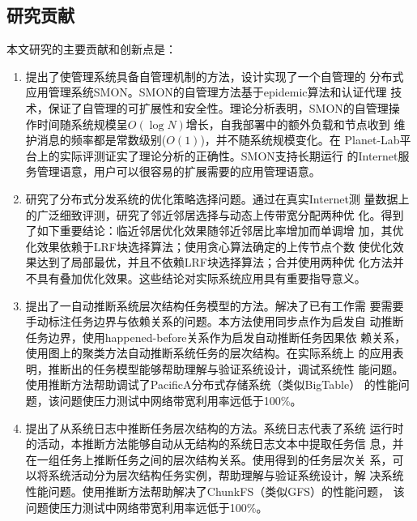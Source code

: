 \subsection{研究贡献}

本文研究的主要贡献和创新点是：

\begin{enumerate}

    \item 提出了使管理系统具备自管理机制的方法，设计实现了一个自管理的
    分布式应用管理系统SMON。SMON的自管理方法基于epidemic算法和认证代理
    技术，保证了自管理的可扩展性和安全性。理论分析表明，SMON的自管理操
    作时间随系统规模呈$O(\log N)$增长，自我部署中的额外负载和节点收到
    维护消息的频率都是常数级别($O(1)$)，并不随系统规模变化。在
    Planet-Lab平台上的实际评测证实了理论分析的正确性。SMON支持长期运行
    的Internet服务管理语意，用户可以很容易的扩展需要的应用管理语意。

    \item 研究了分布式分发系统的优化策略选择问题。通过在真实Internet测
    量数据上的广泛细致评测，研究了邻近邻居选择与动态上传带宽分配两种优
    化。得到了如下重要结论：临近邻居优化效果随邻近邻居比率增加而单调增
    加，其优化效果依赖于LRF块选择算法；使用贪心算法确定的上传节点个数
    使优化效果达到了局部最优，并且不依赖LRF块选择算法；合并使用两种优
    化方法并不具有叠加优化效果。这些结论对实际系统应用具有重要指导意义。

    \item 提出了一自动推断系统层次结构任务模型的方法。解决了已有工作需
    要需要手动标注任务边界与依赖关系的问题。本方法使用同步点作为启发自
    动推断任务边界，使用happened-before关系作为启发自动推断任务因果依
    赖关系，使用图上的聚类方法自动推断系统任务的层次结构。在实际系统上
    的应用表明，推断出的任务模型能够帮助理解与验证系统设计，调试系统性
    能问题。使用推断方法帮助调试了PacificA分布式存储系统（类似BigTable）
    的性能问题，该问题使压力测试中网络带宽利用率远低于100\%。

    \item 提出了从系统日志中推断任务层次结构的方法。系统日志代表了系统
    运行时的活动，本推断方法能够自动从无结构的系统日志文本中提取任务信
    息，并在一组任务上推断任务之间的层次结构关系。使用得到的任务层次关
    系，可以将系统活动分为层次结构任务实例，帮助理解与验证系统设计，解
    决系统性能问题。使用推断方法帮助解决了ChunkFS（类似GFS）的性能问题，
    该问题使压力测试中网络带宽利用率远低于100\%。

\end{enumerate}

